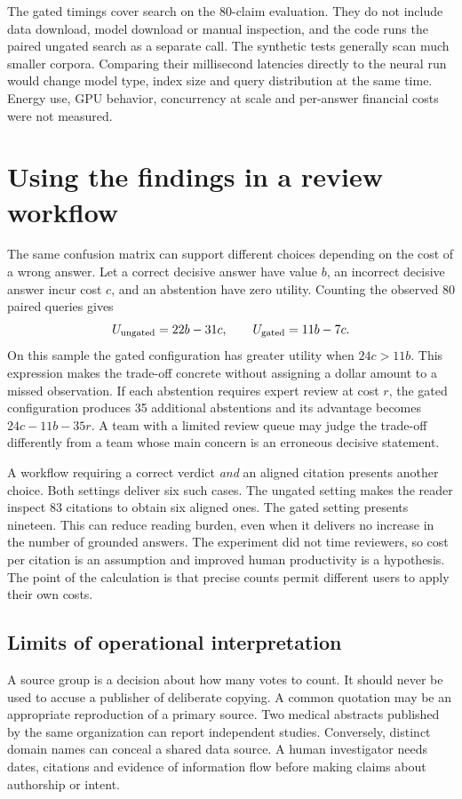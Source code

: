 The gated timings cover search on the 80-claim evaluation. They do not include data download, model download or manual inspection, and the code runs the paired ungated search as a separate call. The synthetic tests generally scan much smaller corpora. Comparing their millisecond latencies directly to the neural run would change model type, index size and query distribution at the same time. Energy use, GPU behavior, concurrency at scale and per-answer financial costs were not measured.

\section{Using the findings in a review workflow}
The same confusion matrix can support different choices depending on the cost of a wrong answer. Let a correct decisive answer have value $b$, an incorrect decisive answer incur cost $c$, and an abstention have zero utility. Counting the observed 80 paired queries gives
\[
 U_{\rm ungated}=22b-31c,\qquad U_{\rm gated}=11b-7c .
\]
On this sample the gated configuration has greater utility when $24c>11b$. This expression makes the trade-off concrete without assigning a dollar amount to a missed observation. If each abstention requires expert review at cost $r$, the gated configuration produces 35 additional abstentions and its advantage becomes $24c-11b-35r$. A team with a limited review queue may judge the trade-off differently from a team whose main concern is an erroneous decisive statement.

A workflow requiring a correct verdict \emph{and} an aligned citation presents another choice. Both settings deliver six such cases. The ungated setting makes the reader inspect 83 citations to obtain six aligned ones. The gated setting presents nineteen. This can reduce reading burden, even when it delivers no increase in the number of grounded answers. The experiment did not time reviewers, so cost per citation is an assumption and improved human productivity is a hypothesis. The point of the calculation is that precise counts permit different users to apply their own costs.

\subsection{Limits of operational interpretation}
A source group is a decision about how many votes to count. It should never be used to accuse a publisher of deliberate copying. A common quotation may be an appropriate reproduction of a primary source. Two medical abstracts published by the same organization can report independent studies. Conversely, distinct domain names can conceal a shared data source. A human investigator needs dates, citations and evidence of information flow before making claims about authorship or intent.


